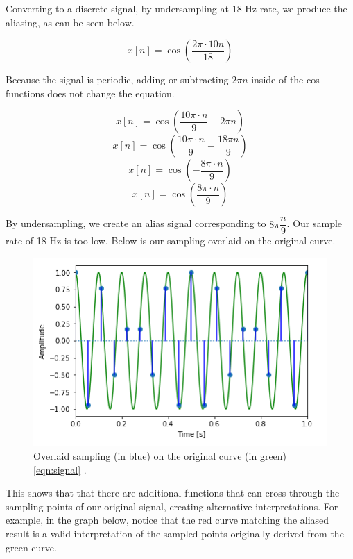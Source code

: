 Converting to a discrete signal, by undersampling at 18 Hz rate, we
produce the aliasing, as can be seen below.

\begin{equation}
	x[n]=\cos(\frac{2\pi \cdot 10n}{18})
\end{equation}

Because the signal is periodic, adding or subtracting $2\pi n$ 
inside of the cos functions does not change the equation.

\begin{equation}
	x[n]=\cos(\frac{10\pi \cdot n}{9} - 2\pi n)
\end{equation}
\begin{equation}
	x[n]=\cos(\frac{10\pi \cdot n}{9} - \frac{18\pi n}{9})
\end{equation}
\begin{equation}
	x[n]=\cos(-\frac{8\pi\cdot n}{9})
\end{equation}
\begin{equation}
	x[n]=\cos(\frac{8\pi\cdot n}{9})
\end{equation}

By undersampling, we create an alias signal corresponding to
\(8\pi\dfrac{n}{9}\). Our sample rate of 18 Hz is too low. Below
is our sampling overlaid on the original curve.

\begin{figure}[H]
	\centering
	\includegraphics[scale = 1]{sub_sample.png} %
	\caption{
		Overlaid sampling (in blue) on the original curve (in green) 
		\ref{eqn:signal} 
		\cite{notebook:sampling}.
	}
	\label{fig:sub_sample}
\end{figure}    

This shows that that there are additional functions that can cross
through the sampling points of our original signal, creating
alternative interpretations. For example, in the graph below,
notice that the red curve matching the aliased result is a valid
interpretation of the sampled points originally derived from the
green curve.

